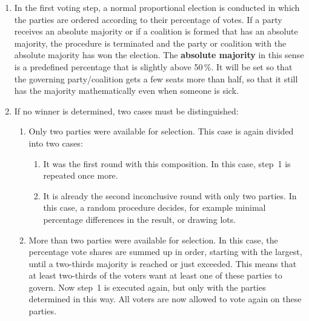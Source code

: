 \begin{enumerate}
  \item In the first voting step, a normal proportional election is conducted in which the parties
    are ordered according to their percentage of votes. If a party receives an
    absolute majority or if a coalition is formed that has an absolute majority,
    the procedure is terminated and the party or coalition with the absolute majority has won the election.
    The \textbf{absolute majority} in this sense is a predefined
    percentage that is slightly above 50\,\%. It will be set so that the
    governing party/coalition gets a few seats more than half, so that it
    still has the majority mathematically even when someone is sick.

  \item If no winner is determined, two cases must be distinguished:

    \begin{enumerate}
      \item Only two parties were available for selection. This case is again divided into two
        cases:

        \begin{enumerate}[label=\roman*.]
          \item It was the first round with this composition. In this case,
            step~1 is repeated once more.

          \item It is already the second inconclusive round with only two parties. In this
            case, a random procedure decides, for example minimal percentage
            differences in the result, or drawing lots.
        \end{enumerate}

      \item More than two parties were available for selection. In this case, the percentage
        vote shares are summed up in order, starting with the largest, until a
        two-thirds majority is reached or just exceeded. This means that at least
        two-thirds of the voters want at least one of these parties to govern. Now
        step~1 is executed again, but only with the parties determined in this way. All voters are
        now allowed to vote again on these parties.
    \end{enumerate}
\end{enumerate}

